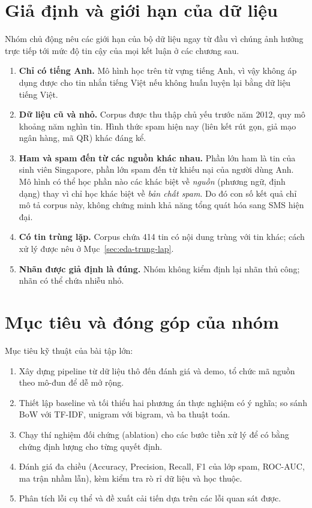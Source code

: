 \section{Giả định và giới hạn của dữ liệu}

Nhóm chủ động nêu các giới hạn của bộ dữ liệu ngay từ đầu vì chúng ảnh hưởng trực tiếp tới mức độ tin cậy của mọi kết luận ở các chương sau.

\begin{enumerate}[label=(\arabic*)]
    \item \textbf{Chỉ có tiếng Anh.} Mô hình học trên từ vựng tiếng Anh, vì vậy không áp dụng được cho tin nhắn tiếng Việt nếu không huấn luyện lại bằng dữ liệu tiếng Việt.
    \item \textbf{Dữ liệu cũ và nhỏ.} Corpus được thu thập chủ yếu trước năm 2012, quy mô khoảng năm nghìn tin. Hình thức spam hiện nay (liên kết rút gọn, giả mạo ngân hàng, mã QR) khác đáng kể.
    \item \textbf{Ham và spam đến từ các nguồn khác nhau.} Phần lớn ham là tin của sinh viên Singapore, phần lớn spam đến từ khiếu nại của người dùng Anh. Mô hình có thể học phần nào các khác biệt về \textit{nguồn} (phương ngữ, định dạng) thay vì chỉ học khác biệt về \textit{bản chất spam}. Do đó con số kết quả chỉ mô tả corpus này, không chứng minh khả năng tổng quát hóa sang SMS hiện đại.
    \item \textbf{Có tin trùng lặp.} Corpus chứa 414 tin có nội dung trùng với tin khác; cách xử lý được nêu ở Mục~\ref{sec:eda-trung-lap}.
    \item \textbf{Nhãn được giả định là đúng.} Nhóm không kiểm định lại nhãn thủ công; nhãn có thể chứa nhiễu nhỏ.
\end{enumerate}

\section{Mục tiêu và đóng góp của nhóm}

Mục tiêu kỹ thuật của bài tập lớn:

\begin{enumerate}[label=(\arabic*)]
    \item Xây dựng pipeline từ dữ liệu thô đến đánh giá và demo, tổ chức mã nguồn theo mô-đun để dễ mở rộng.
    \item Thiết lập baseline và tối thiểu hai phương án thực nghiệm có ý nghĩa; so sánh BoW với TF-IDF, unigram với bigram, và ba thuật toán.
    \item Chạy thí nghiệm đối chứng (ablation) cho các bước tiền xử lý để có bằng chứng định lượng cho từng quyết định.
    \item Đánh giá đa chiều (Accuracy, Precision, Recall, F1 của lớp spam, ROC-AUC, ma trận nhầm lẫn), kèm kiểm tra rò rỉ dữ liệu và học thuộc.
    \item Phân tích lỗi cụ thể và đề xuất cải tiến dựa trên các lỗi quan sát được.
\end{enumerate}

